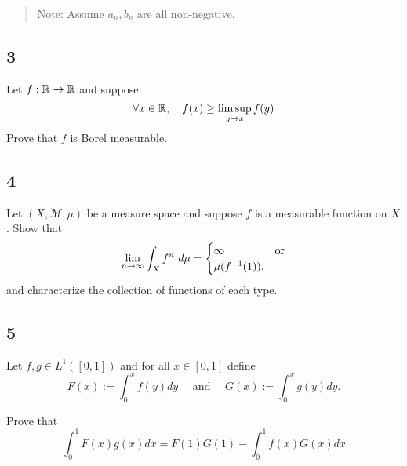 \begin{quote}
Note: Assume \(a_n, b_n\) are all non-negative.
\end{quote}

\hypertarget{section-2}{%
\subsection{3}\label{section-2}}

Let \(f: {\mathbb{R}} \to {\mathbb{R}}\) and suppose \[
\forall x\in {\mathbb{R}},\quad f(x) \geq \limsup _{y \rightarrow x} f(y)
\] Prove that \(f\) is Borel measurable.

\hypertarget{section-3}{%
\subsection{4}\label{section-3}}

Let \((X, \mathcal M, \mu)\) be a measure space and suppose \(f\) is a
measurable function on \(X\). Show that \[
\lim _{n \rightarrow \infty} \int_{X} f^{n} ~d \mu =
\begin{cases}
\infty & \text{or} \\
\mu(f^{-1}(1)),
\end{cases}
\] and characterize the collection of functions of each type.

\hypertarget{section-4}{%
\subsection{5}\label{section-4}}

Let \(f, g \in L^1([0, 1])\) and for all \(x\in [0, 1]\) define \[
F(x):= \int_{0}^{x} f(y) d y \quad \text { and } \quad G(x):= \int_{0}^{x} g(y) d y.
\]

Prove that \[
\int_{0}^{1} F(x) g(x) d x=F(1) G(1)-\int_{0}^{1} f(x) G(x) d x
\]


